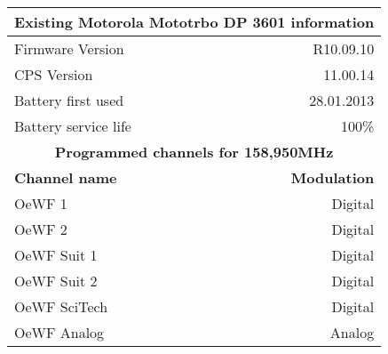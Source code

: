 \begin{tabular}{|l|r|}
	\hline
	\multicolumn{2}{|c|}{\textbf{Existing Motorola Mototrbo DP 3601 information}} \\
	\hline
	Firmware Version & R10.09.10 \\
	CPS Version & 11.00.14 \\
	Battery first used & 28.01.2013 \\
	Battery service life & 100\% \\
	\hline
	\multicolumn{2}{|c|}{\textbf{Programmed channels for 158,950MHz}} \\
	\hline
	\textbf{Channel name} & \textbf{Modulation} \\
	\hline
	OeWF 1 & Digital \\
	OeWF 2 & Digital \\
	OeWF Suit 1 & Digital \\
	OeWF Suit 2 & Digital \\
	OeWF SciTech & Digital \\
	OeWF Analog & Analog \\
	\hline
\end{tabular}